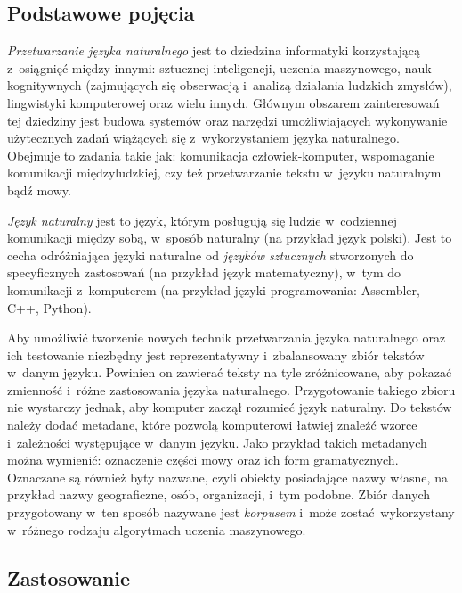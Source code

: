\documentclass[a4paper, twoside, 12pt]{report}
\begin{document}
        \subsection{Podstawowe pojęcia}
            \emph{Przetwarzanie języka naturalnego} jest to dziedzina informatyki korzystającą z~osiągnięć
            między innymi: sztucznej inteligencji, uczenia maszynowego, nauk kognitywnych
            (zajmujących się obserwacją i~analizą działania ludzkich zmysłów), lingwistyki komputerowej oraz
            wielu innych. Głównym obszarem zainteresowań tej dziedziny jest budowa systemów oraz narzędzi
            umożliwiających wykonywanie użytecznych zadań wiążących się z~wykorzystaniem języka naturalnego.
            Obejmuje to zadania takie jak: komunikacja człowiek-komputer, wspomaganie komunikacji międzyludzkiej,
            czy też przetwarzanie tekstu w~języku naturalnym bądź mowy\cite{SPEECHANDLANGUAGEPROCESSING}.

            \emph{Język naturalny} jest to język,
            którym posługują się ludzie w~codziennej komunikacji między sobą, w~sposób naturalny (na przykład
            język polski). Jest to cecha odróżniająca języki naturalne od \emph{języków sztucznych} stworzonych
            do specyficznych zastosowań (na przykład język matematyczny), w~tym do komunikacji z~komputerem
            (na przykład języki programowania: Assembler, C++, Python).

            Aby umożliwić tworzenie nowych technik
            przetwarzania języka naturalnego oraz ich testowanie niezbędny jest reprezentatywny i~zbalansowany
            zbiór tekstów w~danym języku. Powinien on zawierać teksty na tyle zróżnicowane, aby pokazać zmienność
            i~różne zastosowania języka naturalnego. Przygotowanie takiego zbioru nie wystarczy jednak, aby
            komputer zaczął rozumieć język naturalny. Do tekstów należy dodać metadane, które pozwolą komputerowi
            łatwiej znaleźć wzorce i~zależności występujące w~danym języku. Jako przykład takich metadanych można
            wymienić: oznaczenie części mowy oraz ich form gramatycznych. Oznaczane są również byty nazwane, czyli
            obiekty posiadające nazwy własne, na przykład nazwy geograficzne, osób, organizacji, i~tym podobne.
            Zbiór danych przygotowany w~ten sposób nazywane jest \emph{korpusem}\cite{NATURALLANGUGEANNOTATION}
            i~może zostać wykorzystany w~różnego rodzaju algorytmach uczenia maszynowego.
        \subsection {Zastosowanie}
\end{document}
